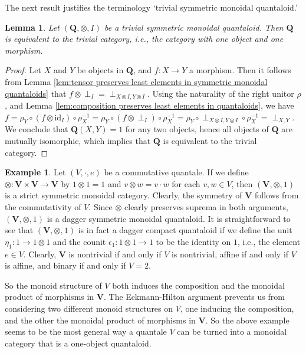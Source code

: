 \documentclass[12pt]{tac}
\newtheorem{lemma}[theorem]{Lemma}
\theoremstyle{definition}
\newtheorem{example}[theorem]{Example}
\theoremstyle{remark}
\newcommand{\<}{\langle}
\renewcommand{\>}{\rangle}
\renewcommand{\:}{\colon}
\newcommand{\id}{\mathrm{id}}
\begin{document}
The next result justifies the terminology `trivial symmetric monoidal quantaloid.'

\begin{lemma}
    Let $(\mathbf Q,\otimes,I)$ be a trivial symmetric monoidal quantaloid. Then $\mathbf Q$ is equivalent to the trivial category, i.e., the category with one object and one morphism. 
\end{lemma}
\begin{proof}
Let $X$ and $Y$ be objects in $\mathbf Q$, and $f:X\to Y$ a morphism. Then it follows from Lemma \ref{lem:tensor preserves least elements in symmetric monoidal quantaloids} that $f\otimes\perp_{I}=\perp_{X\otimes I,Y\otimes I}$. Using the  naturality of the right unitor $\rho$, and Lemma \ref{lem:composition preserves least elements in quantaloids}, we have $f=\rho_Y\circ (f\otimes\id_I)\circ\rho_X^{-1}=\rho_Y\circ (f\otimes \perp_I)\circ \rho_X^{-1}=\rho_Y\circ \perp_{X\otimes I,Y\otimes I}\circ \rho_X^{-1}=\perp_{X,Y}$. 
We conclude that $\mathbf Q(X,Y)=1$ for any two objects, hence all objects of $\mathbf Q$ are mutually isomorphic, which implies that $\mathbf Q$ is equivalent to the trivial category.
\end{proof}


\begin{example}\label{ex:dagger compact quantaloid induced by quantale}
Let $(V,\cdot,e)$ be a commutative quantale. If we define $\otimes:\mathbf V\times\mathbf V\to \mathbf V$ by $1\otimes 1=1$ and $v\otimes w=v\cdot w$ for each $v,w\in V$, then $(\mathbf V,\otimes,1)$ is a strict symmetric monoidal category. Clearly, the symmetry of $\mathbf V$ follows from the commutativity of $V$. Since $\otimes$ clearly preserves suprema in both arguments, $(\mathbf V,\otimes,1)$ is a dagger symmetric monoidal quantaloid. It is straightforward to see that $(\mathbf V,\otimes,1)$ is in fact a dagger compact quantaloid if we define the unit $\eta_1:1\to 1\otimes 1$ and the counit $\epsilon_1:1\otimes 1\to 1$ to be the identity on $1$, i.e., the element $e\in V$. Clearly, $\mathbf V$ is nontrivial if and only if $V$ is nontrivial, affine if and only if $V$ is affine, and binary if and only if $V=2$.  
\end{example}

So the monoid structure of $V$ both induces the composition and the monoidal product of morphisms in $\mathbf V$. The Eckmann-Hilton argument prevents us from considering two different monoid structures on $V$, one inducing the composition, and the other the monoidal product of morphisms in $\mathbf V$. So the above example seems to be the most general way a quantale $V$ can be turned into a monoidal category that is a one-object quantaloid.
\end{document}
